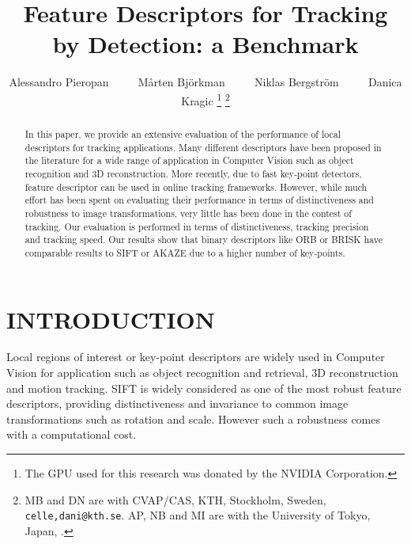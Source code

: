 \documentclass[letterpaper, 10pt, conference]{ieeeconf}
\title{\LARGE \bf Feature Descriptors for Tracking by Detection: a Benchmark}
\author{Alessandro Pieropan ~~~~ Mårten Bj{\"o}rkman  ~~~~ Niklas Bergstr{\"o}m ~~~~ Danica Kragic%
\thanks{The GPU used for this research was donated by the NVIDIA Corporation.}
\thanks{MB and DN are with CVAP/CAS, KTH, Stockholm, Sweden, {\tt celle,dani@kth.se}. AP, NB and MI are with the University of Tokyo, Japan, {\tt }.}}
\begin{document}
                                                                
                                                                                
\maketitle                                                                      
\thispagestyle{empty}                                                           
\pagestyle{empty}



\begin{abstract}
In this paper, we provide an extensive evaluation of the performance of local descriptors for tracking applications.
Many different descriptors have been proposed in the literature for a wide range of application in Computer Vision such as object recognition and 3D reconstruction. More recently, due to fast key-point detectors, feature descriptor can be used in online tracking frameworks. However, while much effort has been spent on evaluating their performance in terms of distinctiveness and robustness to image transformations, very little has been done in the contest of tracking. Our evaluation is performed in terms of distinctiveness, tracking precision and tracking speed. Our results show that binary descriptors like ORB or BRISK have comparable results to SIFT or AKAZE due to a higher number of key-points.    

\end{abstract}

\section{INTRODUCTION}
\label{sec:introduction}



Local regions of interest or key-point descriptors are widely used in Computer Vision for application such as object recognition and retrieval, 3D reconstruction and motion tracking. SIFT \cite{lowe04} is widely considered as one of the most robust feature descriptors, providing distinctiveness and invariance to common image transformations such as rotation and scale. However such a robustness comes with a computational cost. 
\end{document}
